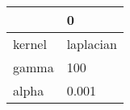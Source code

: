 \begin{tabular}{ll}
\toprule
{} &          0 \\
\midrule
kernel &  laplacian \\
gamma  &        100 \\
alpha  &      0.001 \\
\bottomrule
\end{tabular}
